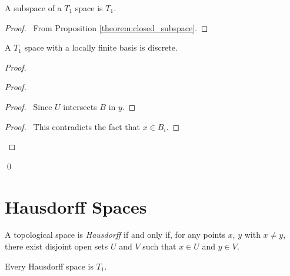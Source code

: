 \begin{proposition}
    \label{proposition:T1_subspace}
    A subspace of a $T_1$ space is $T_1$.
\end{proposition}

\begin{proof}
    \pf\ From Proposition \ref{theorem:closed_subspace}.
\end{proof}

\begin{proposition}
    A $T_1$ space with a locally finite basis is discrete.
\end{proposition}

\begin{proof}
    \pf
    \begin{proof}
        \begin{proof}
            \pf\ Since $U$ intersects $B$ in $y$.
        \end{proof}
        \qedstep
        \begin{proof}
            \pf\ This contradicts the fact that $x \in B_i$.
        \end{proof}
    \end{proof}
    \qed
\end{proof}

\section{Hausdorff Spaces}

\begin{definition}
    A topological space is \emph{Hausdorff} if and only if, for any points $x$, $y$ with $x \neq y$,
    there exist disjoint open sets $U$ and $V$ such that $x \in U$ and $y \in V$.
\end{definition}

\begin{theorem}
    Every Hausdorff space is $T_1$.
\end{theorem}

